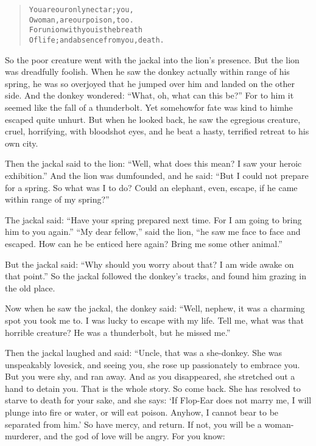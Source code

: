 \documentclass[article, twoside, 14pt]{memoir}
\renewenvironment{verbatim}{%
\begin{quote}%
\vskip -10pt%
\begin{alltt}\normalfont\large}{\end{alltt}%
\end{quote}%
\vskip -10pt
} %
\begin{document}
\begin{verbatim}
You are our only nectar; you,
O woman, are our poison, too.
For union with you is the breath
Of life; and absence from you, death.
\end{verbatim}
So the poor creature went with the jackal into the lion's presence.
But the lion was dreadfully foolish. When he saw the donkey
actually within range of his spring, he was so overjoyed that he
jumped over him and landed on the other side. And the donkey
wondered: ``What, oh, what can this be?'' For to him it seemed like
the fall of a thunderbolt. Yet somehow{\textemdash}for fate was kind to
him{\textemdash}he escaped quite unhurt. But when he looked back, he saw the
egregious creature, cruel, horrifying, with bloodshot eyes, and he
beat a hasty, terrified retreat to his own city.

Then the jackal said to the lion:
``Well, what does this mean? I saw your heroic exhibition.'' And
the lion was dumfounded, and he said:
``But I could not prepare for a spring. So what was I to do? Could an elephant, even, escape, if he came within range of my spring?''

The jackal said:
``Have your spring prepared next time. For I am going to bring him to you again.''
``My dear fellow,'' said the lion,
``he saw me face to face and escaped. How can he be enticed here again? Bring me some other animal.''

But the jackal said:
``Why should you worry about that? I am wide awake on that point.''
So the jackal followed the donkey's tracks, and found him grazing
in the old place.

Now when he saw the jackal, the donkey said:
``Well, nephew, it was a charming spot you took me to. I was lucky to escape with my life. Tell me, what was that horrible creature? He was a thunderbolt, but he missed me.''

Then the jackal laughed and said: “Uncle, that was a she-donkey.
She was unspeakably lovesick, and seeing you, she rose up
passionately to embrace you. But you were shy, and ran away. And as
you disappeared, she stretched out a hand to detain you. That is
the whole story. So come back. She has resolved to starve to death
for your sake, and she says:
`If Flop-Ear does not marry me, I will plunge into fire or water, or will eat poison. Anyhow, I cannot bear to be separated from him.'
So have mercy, and return. If not, you will be a woman-murderer,
and the god of love will be angry. For you know:
\end{document}
